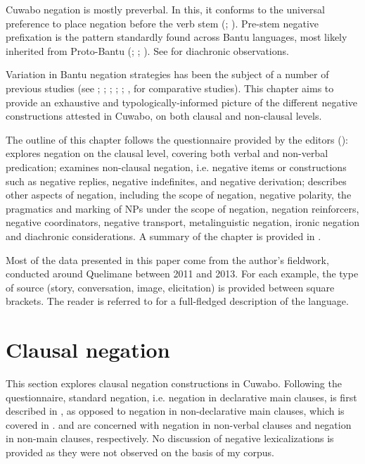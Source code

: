 \documentclass[output=paper,colorlinks=true, citecolor=brown,draftmode]{langscibook}
\begin{document}
Cuwabo negation is mostly preverbal. In this, it conforms to the universal preference to place negation before the verb stem (\citealt{Dahl1979}; \citealt{Dryer1988, Dryer2011-wals143}). Pre-stem negative prefixation is the pattern standardly found across Bantu languages, most likely inherited from Proto-Bantu (\citealt{Westphal1958}; \citealt{KambaMuzenga1981}; \citealt{Güldemann1999}). See  for diachronic observations.

Variation in Bantu negation strategies has been the subject of a number of previous studies (see \citealt{Westphal1958}; \citealt{KambaMuzenga1981}; \citealt{Contini-Morava1989}; \citealt{Güldemann1999}; \citealt{DevosAuwera2013}; \citealt{GuéroisEtAlForthcoming}, for comparative studies). This chapter aims to provide an exhaustive and typologically-informed
picture of the different negative constructions attested in Cuwabo, on both clausal and non-clausal levels.

The outline of this chapter follows the questionnaire provided by the editors ():
 explores negation on the clausal level, covering both verbal and non-verbal predication;  examines non-clausal negation, i.e. negative items or constructions such as negative replies, negative indefinites, and negative derivation;  describes other aspects of negation, including the scope of negation, negative polarity, the pragmatics and marking of NPs under the scope of negation, negation reinforcers, negative coordinators, negative transport, metalinguistic negation, ironic negation and diachronic considerations. A summary of the chapter is provided in .

Most of the data presented in this paper come from the author’s fieldwork, conducted around Quelimane between 2011 and 2013. For each example, the type of source (story, conversation, image, elicitation) is provided between square brackets. The reader is referred to \citet{Guérois2015,Guérois2019} for a full-fledged description of the language. 

\section{Clausal negation}\label{sec:cuw:2}
This section explores clausal negation constructions in Cuwabo. Following the questionnaire, standard negation, i.e. negation in declarative main clauses, is first described in , as opposed to negation in non-declarative main clauses, which is covered in .  and  are concerned with negation in non-verbal clauses and negation in non-main clauses, respectively. No discussion of negative lexicalizations \citep{Veselinova2013lexicalization} is provided as they were not observed on the basis of my corpus.
\end{document}
